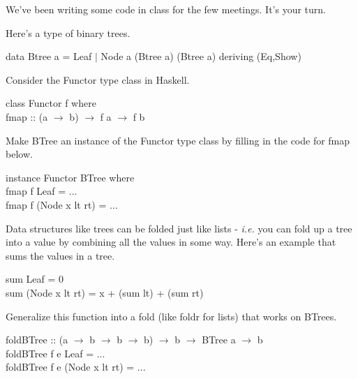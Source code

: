 \documentclass[11pt]{article}
\begin{document}

\noindent{}We've been writing some code in class for the few meetings.  It's your turn.


\noindent{}Here's a type of binary trees.

\begin{smallprogram*}
\> data Btree a = Leaf $|$ Node a (Btree a) (Btree a) deriving (Eq,Show)
\end{smallprogram*}

\noindent{}Consider the Functor type class in Haskell.

\begin{smallprogram*}
\> class Functor f where   \\
\>    fmap :: (a $\rightarrow$ b) $\rightarrow$ f a $\rightarrow$ f b  
\end{smallprogram*}

\begin{exercise}
Make BTree an instance of the Functor type class by filling in the code for fmap below.

\begin{smallprogram*}
\> instance Functor BTree where   \\
\>   fmap f Leaf  = ... \\
\>   fmap f (Node x lt rt) = ... 
\end{smallprogram*}
\end{exercise}

Data structures like trees can be folded just like lists - {\em{i.e.}} you can
fold up a tree into a value by combining all the values in some way.  Here's an
example that sums the values in a tree.

\begin{smallprogram*}
\> sum Leaf = 0\\
\> sum (Node x lt rt) = x + (sum lt) + (sum rt)
\end{smallprogram*}

\begin{exercise}
Generalize this function into a fold (like foldr for lists) that works on BTrees.
\begin{smallprogram*}
\> foldBTree :: (a $\rightarrow$ b $\rightarrow$ b $\rightarrow$ b) $\rightarrow$ b $\rightarrow$ BTree a $\rightarrow$ b\\
\> foldBTree f e Leaf =  ... \\
\> foldBTree f e (Node x lt rt) = ...
\end{smallprogram*}
\end{exercise}
\end{document}
